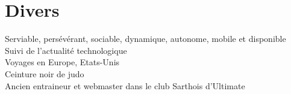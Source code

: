 \documentclass[]{friggeri-cv} %
\begin{document}







\section{Divers}
Serviable, persévérant, sociable, dynamique, autonome, mobile et disponible\\
Suivi de l’actualité technologique\\
Voyages en Europe, Etats-Unis\\
Ceinture noir de judo\\
Ancien entraineur et webmaster dans le club Sarthois d’Ultimate 
\end{document}
